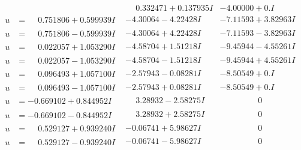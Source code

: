 \documentclass[1p]{elsarticle_modified}
\theoremstyle{definition}
\begin{document}
$$\begin{array}{c|c|c}
 & \phantom{-}0.332471 + 0.137935 I & -4.00000 + 0. I\phantom{ +0.000000I} \\ \hline\begin{aligned}
u &= \phantom{-}0.751806 + 0.599939 I\end{aligned}
 & -4.30064 - 4.22428 I & -7.11593 + 3.82963 I \\ \hline\begin{aligned}
u &= \phantom{-}0.751806 - 0.599939 I\end{aligned}
 & -4.30064 + 4.22428 I & -7.11593 - 3.82963 I \\ \hline\begin{aligned}
u &= \phantom{-}0.022057 + 1.053290 I\end{aligned}
 & -4.58704 + 1.51218 I & -9.45944 - 4.55261 I \\ \hline\begin{aligned}
u &= \phantom{-}0.022057 - 1.053290 I\end{aligned}
 & -4.58704 - 1.51218 I & -9.45944 + 4.55261 I \\ \hline\begin{aligned}
u &= \phantom{-}0.096493 + 1.057100 I\end{aligned}
 & -2.57943 - 0.08281 I & -8.50549 + 0. I\phantom{ +0.000000I} \\ \hline\begin{aligned}
u &= \phantom{-}0.096493 - 1.057100 I\end{aligned}
 & -2.57943 + 0.08281 I & -8.50549 + 0. I\phantom{ +0.000000I} \\ \hline\begin{aligned}
u &= -0.669102 + 0.844952 I\end{aligned}
 & \phantom{-}3.28932 - 2.58275 I & \phantom{-0.000000 } 0 \\ \hline\begin{aligned}
u &= -0.669102 - 0.844952 I\end{aligned}
 & \phantom{-}3.28932 + 2.58275 I & \phantom{-0.000000 } 0 \\ \hline\begin{aligned}
u &= \phantom{-}0.529127 + 0.939240 I\end{aligned}
 & -0.06741 + 5.98627 I & \phantom{-0.000000 } 0 \\ \hline\begin{aligned}
u &= \phantom{-}0.529127 - 0.939240 I\end{aligned}
 & -0.06741 - 5.98627 I & \phantom{-0.000000 } 0 \\ \hline\begin{aligned}

\end{aligned}
\end{array}$$
\end{document}
